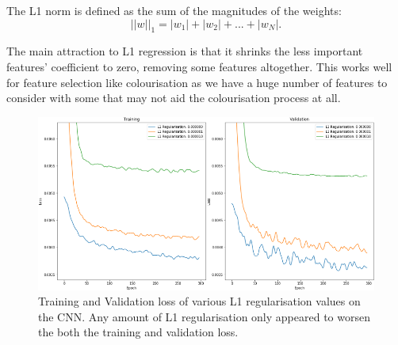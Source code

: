 \documentclass{l4proj}
\begin{document}
The L1 norm is defined as the sum of the magnitudes of the weights:
\begin{equation}
    ||w||_{1} = |w_{1}| + |w_{2}| + ... + |w_{N}|.
\end{equation}

The main attraction to L1 regression is that it shrinks the less important features' coefficient to zero, removing some features altogether. This works well for feature selection like colourisation as we have a huge number of features to consider with some that may not aid the colourisation process at all.
\begin{figure}[H]
    \centering
    \includegraphics[width=0.9\linewidth]{images/L1Regularisation.PNG}    

    \caption{Training and Validation loss of various L1 regularisation values on the CNN. Any amount of L1 regularisation only appeared to worsen the both the training and validation loss.}

    \label{fig:l1regularisation} 
\end{figure}
\end{document}
